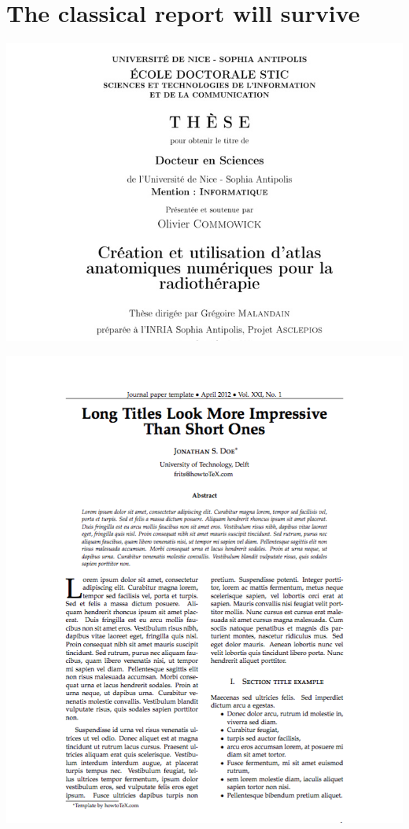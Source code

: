 \documentclass[%
oneside,                 %
final,                   %
chapterprefix=true,      %
open=right               %
10pt]{book}
\begin{document}
\section{The classical report will survive}


\begin{center}  %
  \centerline{\includegraphics[width=1.2\linewidth]{../doc/slides/fig/latex_thesis.jpg}}
\end{center}



\begin{center}  %
  \centerline{\includegraphics[width=1.2\linewidth]{../doc/slides/fig/latex_paper1.png}}
\end{center}
\end{document}
